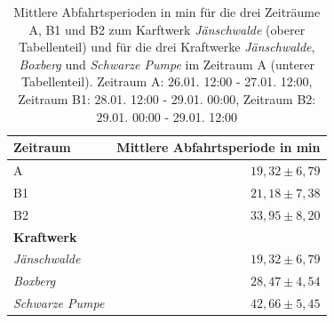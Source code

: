 \begin{table}[!ht]
	\centering
	\caption{Mittlere Abfahrtsperioden in min für die drei Zeiträume A, B1 und B2 zum Karftwerk \emph{Jänschwalde} (oberer Tabellenteil) und für die drei Kraftwerke \emph{Jänschwalde}, \emph{Boxberg} und \emph{Schwarze Pumpe} im Zeitraum A (unterer Tabellenteil). Zeitraum A: 26.01. 12:00 - 27.01. 12:00, Zeitraum B1: 28.01. 12:00 - 29.01. 00:00, Zeitraum B2: 29.01. 00:00 - 29.01. 12:00}
	\label{tab:results}
	\begin{tabular}{|l|r|}
		\hline
		\textbf{Zeitraum} & \textbf{Mittlere Abfahrtsperiode in min} \\
		\hline
		\hline
		A & $19,32 \pm 6,79$\\
		\hline
		B1 & $21,18 \pm 7,38$\\
		\hline
        B2 & $33,95 \pm 8,20$\\
		\hline
		\hline
        \textbf{Kraftwerk} & \\
		\hline
		\hline
        \emph{Jänschwalde} & $19,32 \pm 6,79$\\
		\hline
        \emph{Boxberg} & $28,47 \pm 4,54$\\
		\hline
		\emph{Schwarze Pumpe} & $42,66 \pm 5,45$\\
		\hline
	\end{tabular}
\end{table}